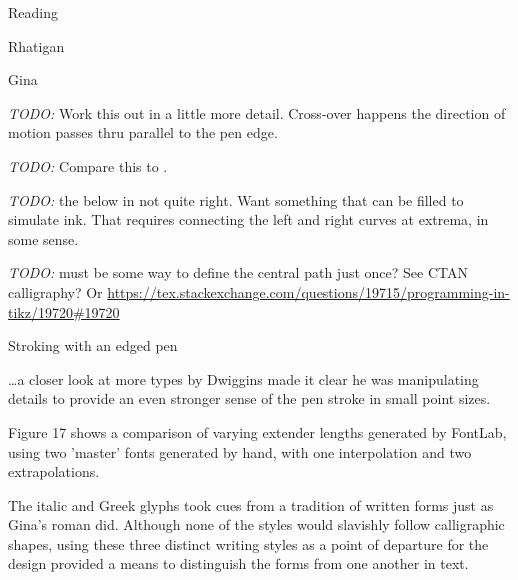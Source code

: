 \documentclass[11pt]{PalisadesLakesBook}
\begin{document}
\begin{plSection}{Reading}
\begin{plSection}{Rhatigan}
\begin{plSection}{Gina}
\begin{plSection}{}
\emph{TODO:} Work this out in a little more detail. 
Cross-over happens the direction of motion passes thru parallel 
to the pen edge.

\emph{TODO:} 
Compare this to .

\emph{TODO:} the below in not quite right.
Want something that can be filled to simulate ink.
That requires connecting the left and right curves
at extrema, in some sense.

\emph{TODO:} must be some way to define the central path just once? 
See CTAN calligraphy?
Or \url{https://tex.stackexchange.com/questions/19715/programming-in-tikz/19720#19720}


\begin{plDiagram}{Stroking with an edged pen}{}
\center
{}
\end{plDiagram}

\begin{plQuote}{}{}
\ldots a closer look at more types 
by Dwiggins made it clear he was manipulating details to provide 
an even stronger sense of the pen stroke in small point sizes.
\end{plQuote}

Figure 17 shows a comparison of varying extender lengths
generated by FontLab, using two 'master' fonts generated by hand,
with one interpolation and two extrapolations.

\begin{plQuote}{}{}
The italic and Greek glyphs took cues from a tradition of
written forms just as Gina's roman did.
Although none of the styles would slavishly follow calligraphic 
shapes,
using these three distinct writing styles as a point of departure
for the design provided a means to distinguish the forms from one
another in text.
\end{plQuote}


\end{plSection}
\end{plSection}
\end{plSection}
\end{plSection}
\end{document}
